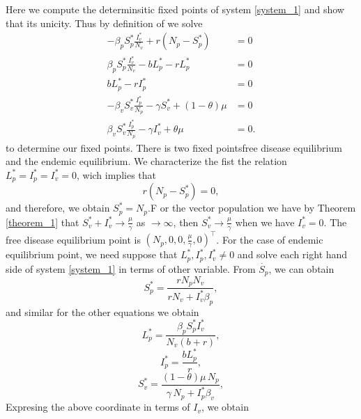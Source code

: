 Here we compute the determinsitic fixed points of system 
\eqref{system_1} and show that its unicity. Thus by definition of we solve 
%
\begin{equation}
	\begin{aligned}
		-\beta_p S_p^* \frac{I_v^*}{N_v} + r(N_p-S_p^*) &= 0\\
		\beta_p S_p^* \frac{I_v^*}{N_v} - b L_p^* - r L_p^* &= 0\\
		b L_p^* - r I_p^* &= 0\\
		-\beta_v S_v^* \frac{I_p^*}{N_p} -\gamma S_v^* +(1-\theta) \mu &= 0\\
		\beta_v S_v^* \frac{I_p^*}{N_p} -\gamma I_v^* + \theta \mu &= 0.
	\end{aligned}
\end{equation}
to determine our fixed points.
%
There is two fixed points\textemdash free disease equilibrium and the 
endemic equilibrium. We characterize the fist the relation
$ L^*_p=I_p^*=I_v^*=0$, wich implies that
%
\begin{equation*}
	r(N_p-S^*_p) = 0,
\end{equation*}
%
and therefore, we obtain $S_p^*=N_p$.F or the vector population we have by 
Theorem \eqref{theorem_1} that $S_v^*+I_v^* \rightarrow \frac{\mu}{\gamma}$ as 
$\rightarrow \infty$, then $S_v^* \rightarrow \frac{\mu}{\gamma}$ when we have 
$I^*_v=0$.
%
The free disease equilibrium point is $(N_p,0,0,\frac{\mu}{\gamma},0)^{\top}$. 
For the case of endemic equilibrium point, we need suppose that $L_p^*,I_p^*,I_
v^*\neq0$ and solve each right hand side of system \eqref{system_1} in terms 
of other variable.
%
From $\dot{S_p}$, we can obtain
%
\begin{equation*}
	S^*_p= \frac{rN_{{p}}N_{{v}}}{rN_{{v}}+I^*_v\beta_{{p}}},
\end{equation*}
%
 and similar for the other equations we obtain
\begin{equation*}
	L^*_p = \frac{\beta_{{p}}S_p^* I_v^*}{N_{{v}} \left( b+r \right)},
\end{equation*}
%
\begin{equation*}
	I^*_p =\frac{b L^*_p}{r},
\end{equation*}
%
\begin{equation*}
	S^*_v =
		\frac{
			\left( 
				1-\theta 
			\right) 
			\mu\, N_{p}
		}{
			\gamma\, N_{p} + I ^ * _ p
			\beta_{v}
		},
\end{equation*}
%
Expresing the above coordinate in terms of $I_v$, we obtain
